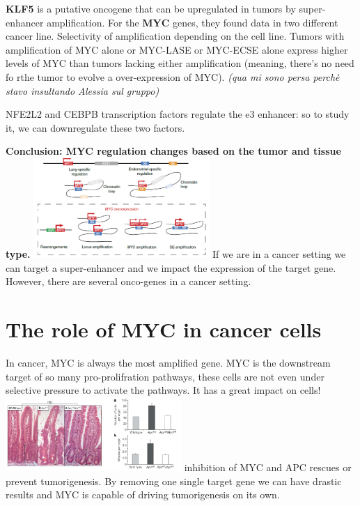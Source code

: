 \textbf{KLF5} is a putative oncogene that can be upregulated in tumors by super-enhancer amplification.
For the \textbf{MYC} genes, they found data in two different cancer line. Selectivity of amplification depending on the cell line.
Tumors with amplification of MYC alone or MYC-LASE or MYC-ECSE alone express higher levels of MYC than tumors lacking either amplification (meaning, there's no need fo rthe tumor to evolve a over-expression of MYC).
\emph{(qua mi sono persa perchè stavo insultando Alessia sul gruppo)}

NFE2L2 and CEBPB transcription factors regulate the e3 enhancer: so to study it, we can downregulate these two factors.

\textbf{Conclusion: MYC regulation changes based on the tumor and tissue type.}
\includegraphics[width=0.5\textwidth]{../_resources/732d6434382fbc8bdbd24c49c23cdaf7.png}
If we are in a cancer setting we can target a super-enhancer and we impact the expression of the target gene. However, there are several onco-genes in a cancer setting.

\hypertarget{the-role-of-myc-in-cancer-cells}{%
\section{The role of MYC in cancer cells}\label{the-role-of-myc-in-cancer-cells}}

In cancer, MYC is always the most amplified gene. MYC is the downstream target of so many pro-prolifration pathways, these cells are not even under selective pressure to activate the pathways.
It has a great impact on cells!
\includegraphics[width=0.5\textwidth]{../_resources/641af477cb65d73954e1ae24aab9a2ed.png}
inhibition of MYC and APC rescues or prevent tumorigenesis. By removing one single target gene we can have drastic results and MYC is capable of driving tumorigenesis on its own.

